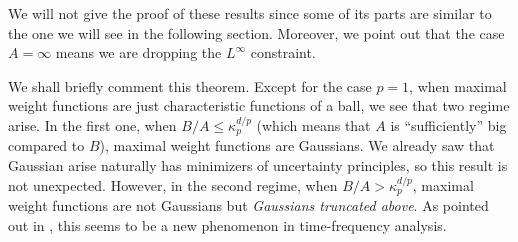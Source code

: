 \documentclass[corpo=11pt, stile=classica, tipotesi=custom,
greek, evenboxes, english]{toptesi}
\numberwithin{equation}{chapter}
\theoremstyle{definition}
\theoremstyle{remark}
\begin{document}
We will not give the proof of these results since some of its parts are similar to the one we will see in the following section. Moreover, we point out that the case $A=
\infty$ means we are dropping the $L^{\infty}$ constraint. 

We shall briefly comment this theorem. Except for the case $p=1$, when maximal weight functions are just characteristic functions of a ball, we see that two regime arise. In the first one, when $B/A \leq \kappa_p^{d/p}$ (which means that $A$ is ``sufficiently'' big compared to $B$), maximal weight functions are Gaussians. We already saw that Gaussian arise naturally has minimizers of uncertainty principles, so this result is not unexpected. However, in the second regime, when $B/A > \kappa_p^{d/p}$, maximal weight functions are not Gaussians but \emph{Gaussians truncated above}. As pointed out in \cite{nicolatilli_norm}, this seems to be a new phenomenon in time-frequency analysis.
\end{document}
